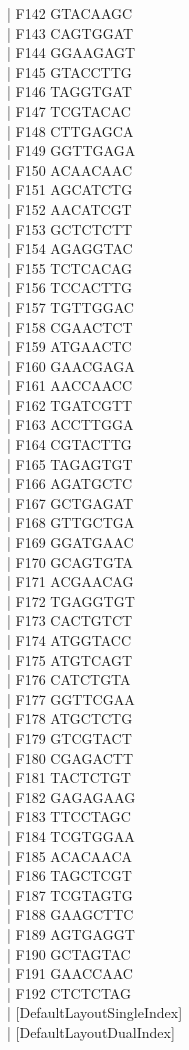 \documentclass[titlepage,10pt,a4paper,uplatex]{jsbook}
\newenvironment{content}{\begin{shaded}\vspace{-1em}\raggedright\ttfamily\footnotesize\setlength{\baselineskip}{1.4em}}{\end{shaded}\vspace{-1em}}
\begin{document}
\begin{content}
| F142	GTACAAGC\\
| F143	CAGTGGAT\\
| F144	GGAAGAGT\\
| F145	GTACCTTG\\
| F146	TAGGTGAT\\
| F147	TCGTACAC\\
| F148	CTTGAGCA\\
| F149	GGTTGAGA\\
| F150	ACAACAAC\\
| F151	AGCATCTG\\
| F152	AACATCGT\\
| F153	GCTCTCTT\\
| F154	AGAGGTAC\\
| F155	TCTCACAG\\
| F156	TCCACTTG\\
| F157	TGTTGGAC\\
| F158	CGAACTCT\\
| F159	ATGAACTC\\
| F160	GAACGAGA\\
| F161	AACCAACC\\
| F162	TGATCGTT\\
| F163	ACCTTGGA\\
| F164	CGTACTTG\\
| F165	TAGAGTGT\\
| F166	AGATGCTC\\
| F167	GCTGAGAT\\
| F168	GTTGCTGA\\
| F169	GGATGAAC\\
| F170	GCAGTGTA\\
| F171	ACGAACAG\\
| F172	TGAGGTGT\\
| F173	CACTGTCT\\
| F174	ATGGTACC\\
| F175	ATGTCAGT\\
| F176	CATCTGTA\\
| F177	GGTTCGAA\\
| F178	ATGCTCTG\\
| F179	GTCGTACT\\
| F180	CGAGACTT\\
| F181	TACTCTGT\\
| F182	GAGAGAAG\\
| F183	TTCCTAGC\\
| F184	TCGTGGAA\\
| F185	ACACAACA\\
| F186	TAGCTCGT\\
| F187	TCGTAGTG\\
| F188	GAAGCTTC\\
| F189	AGTGAGGT\\
| F190	GCTAGTAC\\
| F191	GAACCAAC\\
| F192	CTCTCTAG\\
| [DefaultLayout{\textunderscore}SingleIndex]\\
| [DefaultLayout{\textunderscore}DualIndex]
\end{content}
\end{document}
